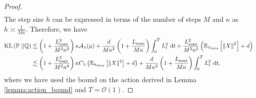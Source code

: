 \begin{proof}
\begin{align*}
\end{align*}
The step size $h$ can be expressed in terms of the number of steps $M$ and $\kappa$ as $h\asymp \frac{1}{M\kappa}$. Therefore, we have
\begin{align*}
    \operatorname*{KL}\left(\mathbb{P}\;||\mathbb{Q}\right)&\lesssim\left(1+\frac{L_{\max}^2}{M^2\kappa^2}\right) \kappa \mathcal{A}_\lambda(\mu) + \frac{d}{M\kappa^2}\left(1+  \frac{L_{\max}}{M\kappa}\right)\int_{0}^{T}L_{ t}^2 \ \mathrm{d} t+ \frac{L_{\max}^2}{M^2\kappa^3} \left(\mathbb{E}_{\operatorname*{\pi_{\text{data}}}}\left[\left\Vert X\right\Vert^2\right] + d\right)\\
    &\lesssim \left(1+\frac{L_{\max}^2}{M^2\kappa^4}\right) \kappa C_\lambda \left(\mathbb{E}_{\operatorname*{\pi_{\text{data}}}}\left[\Vert X\Vert^2\right] +  d\right) + \frac{d}{M\kappa^2}\left(1+  \frac{L_{\max}}{M\kappa}\right)\int_{0}^{T}L_{ t}^2 \ \mathrm{d} t,
\end{align*}
where we have used the bound on the action derived in Lemma \ref{lemma:action_bound} and $T = \mathcal{O}(1)$.


\end{proof}
